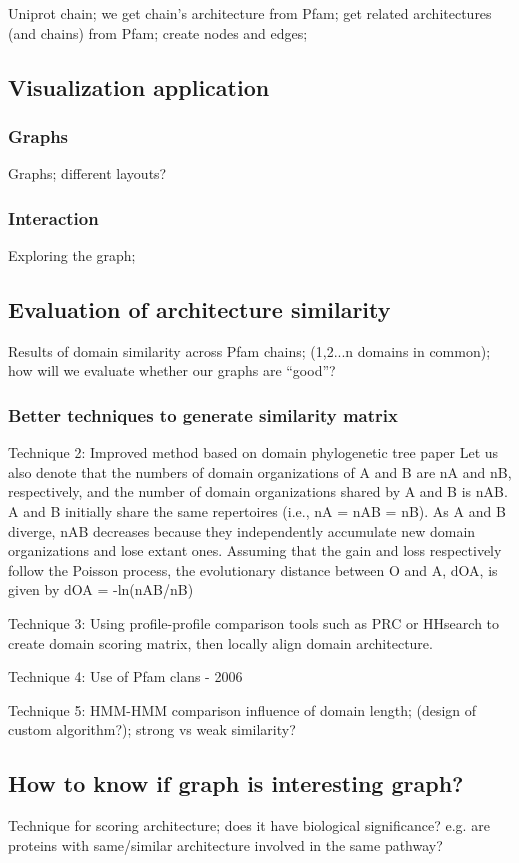 Uniprot chain; we get chain's architecture from Pfam; get related architectures (and chains) from Pfam; create nodes and edges;

\subsection{Visualization application}

\subsubsection{Graphs}
Graphs; different layouts? 

\subsubsection{Interaction}
Exploring the graph;


\subsection{Evaluation of architecture similarity}
Results of domain similarity across Pfam chains; (1,2...n domains in common); how will we evaluate whether our graphs are ``good''?


\subsubsection{Better techniques to generate similarity matrix}
Technique 2: Improved method based on domain phylogenetic tree paper
Let us also denote that the numbers of domain organizations of A and B are nA and nB, respectively, and the number of domain organizations shared by A and B is nAB. A and B initially share the same repertoires (i.e., nA = nAB = nB). As A and B diverge, nAB decreases because they independently accumulate new domain organizations and lose extant ones. Assuming that the gain and loss respectively follow the Poisson process, the evolutionary distance between O and A, dOA, is given by  dOA = -ln(nAB/nB)

Technique 3: Using profile-profile comparison tools such as PRC or HHsearch to create domain scoring matrix, then locally align domain architecture.

Technique 4: Use of Pfam clans - 2006

Technique 5: HMM-HMM comparison
influence of domain length; (design of custom algorithm?); strong vs weak similarity?

\subsection{How to know if graph is interesting graph?}
Technique for scoring architecture; does it have biological significance? e.g. are proteins with same/similar architecture involved in the same pathway?

